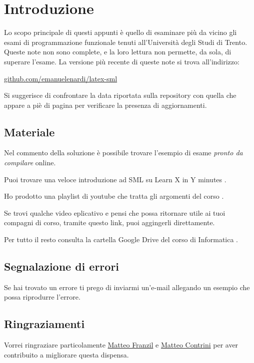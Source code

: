 \section*{Introduzione}

Lo scopo principale di questi appunti è quello di esaminare più da vicino gli esami di programmazione funzionale tenuti all'Università degli Studi di Trento. Queste note non sono complete, e la loro lettura non permette, da sola, di superare l’esame. La versione più recente di queste note si trova all'indirizzo:

\begin{center}
	\url{github.com/emanuelenardi/latex-sml}
\end{center}

Si suggerisce di confrontare la data riportata sulla repository con quella che appare a piè di pagina per verificare la presenza di aggiornamenti.

\subsection*{Materiale}

Nel commento della soluzione è possibile trovare l'esempio di esame \emph{pronto da compilare} online.

\smallskip
Puoi trovare una veloce introduzione ad SML su Learn X in Y minutes %
\href{https://learnxinyminutes.com/docs/standard-ml/}{\ExternalLink}.

\smallskip
Ho prodotto una playlist di youtube che tratta gli argomenti del corso %
\href{bit.ly/sml-youtube-playlist}{\ExternalLink}.

\smallskip
Se trovi qualche video eplicativo e pensi che possa ritornare utile ai tuoi compagni di corso, tramite questo link, puoi aggingerli direttamente.

\smallskip
Per tutto il resto consulta la cartella Google Drive del corso di Informatica %
\href{https://bit.ly/drive-folder}{\ExternalLink}.

\subsection*{Segnalazione di errori}

Se hai trovato un errore ti prego di inviarmi un'e-mail \href{mailto:emanuele.nardi@studenti.unitn.it}{\ExternalLink} allegando un esempio che possa riprodurre l'errore.

\subsection*{Ringraziamenti}

Vorrei ringraziare particolamente \href{https://github.com/mfranzil}{Matteo Franzil} e \href{https://github.com/matteocontrini}{Matteo Contrini} per aver contribuito a migliorare questa dispensa.
